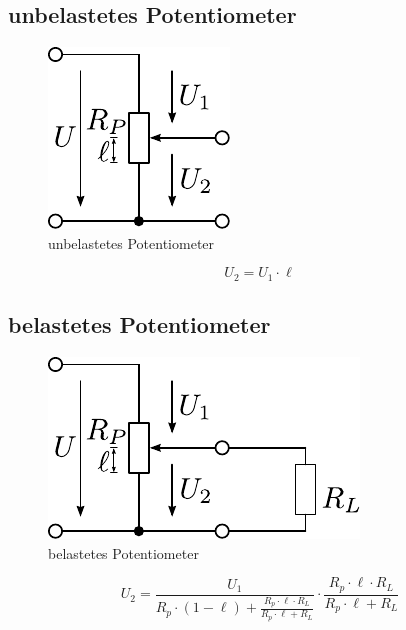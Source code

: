 \subsection{unbelastetes Potentiometer}
\begin{figure}[h!]
	\centering
	\includegraphics[scale=\schscale]{poti.pdf}
	\caption{unbelastetes Potentiometer}
	\label{sch:poti}
\end{figure}
\[ U_2 = U_1 \cdot \ell \]

\subsection{belastetes Potentiometer}
\begin{figure}[h!]
	\centering
	\includegraphics[scale=\schscale]{potibel.pdf}
	\caption{belastetes Potentiometer}
	\label{sch:potibel}
\end{figure}
\[ U_2 = \frac{U_1}{R_p \cdot (1 - \ell) + \frac{R_p \cdot \ell \cdot R_L}{R_p \cdot \ell + R_L}} \cdot \frac{R_p \cdot \ell \cdot R_L}{R_p \cdot \ell + R_L} \]
